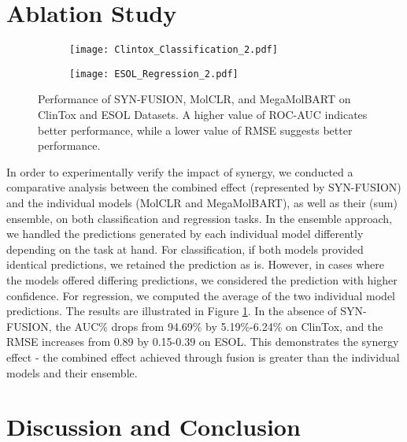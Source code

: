 \documentclass[sigconf,nonacm]{acmart}
\begin{document}
\section{Ablation Study}
\begin{figure}[!t]
    \begin{subfigure}
    \centering
\texttt{[image: Clintox\_Classification\_2.pdf]}
    \end{subfigure}
    \begin{subfigure}
    \centering
\texttt{[image: ESOL\_Regression\_2.pdf]}
    \end{subfigure}
    \vspace{-0.2cm}
    \caption{Performance of SYN-FUSION, MolCLR, and MegaMolBART on ClinTox and ESOL Datasets. A higher value of ROC-AUC indicates better performance, while a lower value of RMSE suggests better performance.}
    \label{Ablation}
\end{figure}
In order to experimentally verify the impact of synergy, we conducted a comparative analysis between the combined effect (represented by SYN-FUSION) and the individual models (MolCLR and MegaMolBART), as well as their (sum) ensemble, on both classification and regression tasks. In the ensemble approach, we handled the predictions generated by each individual model differently depending on the task at hand. For classification, if both models provided identical predictions, we retained the prediction as is. However, in cases where the models offered differing predictions, we considered the prediction with higher confidence. For regression, we computed the average of the two individual model predictions. The results are illustrated in Figure \ref{Ablation}. In the absence of SYN-FUSION, the AUC\% drops from 94.69\% by 5.19\%-6.24\% on ClinTox, and the RMSE increases from 0.89 by 0.15-0.39 on ESOL. This demonstrates the synergy effect - the combined effect achieved through fusion is greater than the individual models and their ensemble.

\vspace{-0.2cm}
\section{Discussion and Conclusion}
\end{document}
